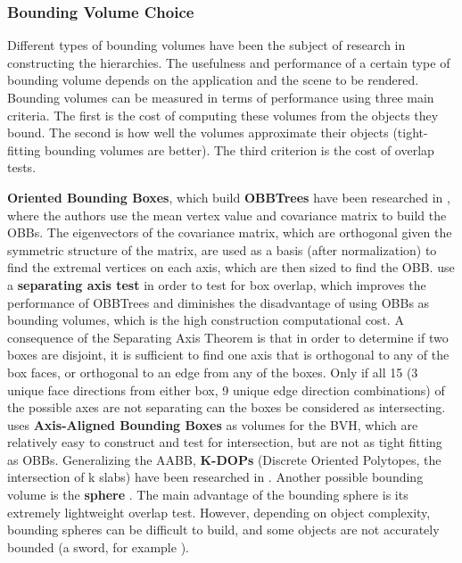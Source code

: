 \subsubsection{Bounding Volume Choice}
\label{sub-sub-sec:bvc}

Different types of bounding volumes have been the subject of research in constructing the hierarchies. The usefulness and performance of a certain type of bounding volume depends on the application and the scene to be rendered. Bounding volumes can be measured in terms of performance using three main criteria. The first is the cost of computing these volumes from the objects they bound. The second is how well the volumes approximate their objects (tight-fitting bounding volumes are better). The third criterion is the cost of overlap tests.




\textbf{Oriented Bounding Boxes}, which build \textbf{OBBTrees} have been researched in \citep{gott96}, where the authors use the mean vertex value and covariance matrix to build the OBBs. The eigenvectors of the covariance matrix, which are orthogonal given the symmetric structure of the matrix, are used as a basis (after normalization) to find the extremal vertices on each axis, which are then sized to find the OBB.
\citep{gott96} use a \textbf{separating axis test} in order to test for box overlap, which improves the performance of OBBTrees and diminishes the disadvantage of using OBBs as bounding volumes, which is the high construction computational cost. A consequence of the Separating Axis Theorem is that in order to determine if two boxes are disjoint, it is sufficient to find one axis that is orthogonal to any of the box faces, or orthogonal to an edge from any of the boxes. Only if all 15 (3 unique face directions from either box, 9 unique edge direction combinations) of the possible axes are not separating can the boxes be considered as intersecting. \citep{vdb97} uses \textbf{Axis-Aligned Bounding Boxes} as volumes for the BVH, which are relatively easy to construct and test for intersection, but are not as tight fitting as OBBs. Generalizing the AABB, \textbf{K-DOPs} (Discrete Oriented Polytopes, the intersection of k slabs) have been researched in \citep{klo98}. Another possible bounding volume is the \textbf{sphere} \citep{hub96, rtsd01}. The main advantage of the bounding sphere is its extremely lightweight overlap test. However, depending on object complexity, bounding spheres can be difficult to build, and some objects are not accurately bounded (a sword, for example \citep{rtcd}).

